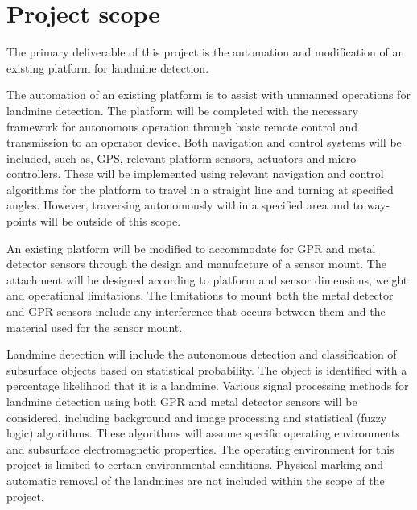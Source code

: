 \documentclass[main.tex]{subfiles}
\begin{document}
\section{Project scope}

The primary deliverable of this project is the automation and modification of an existing platform for landmine detection. %

The automation of an existing platform is to assist with unmanned operations for landmine detection. The platform will be completed with the necessary framework for autonomous operation through basic remote control and transmission to an operator device. Both navigation and control systems will be included, such as, GPS, relevant platform sensors, actuators and micro controllers. These will be implemented using relevant navigation and control algorithms for the platform to travel in a straight line and turning at specified angles. However, traversing autonomously within a specified area and to way-points will be outside of this scope. 

An existing platform will be modified to accommodate for GPR and metal detector sensors through the design and manufacture of a sensor mount. The attachment will be designed according to platform and sensor dimensions, weight and operational limitations. The limitations to mount both the metal detector and GPR sensors include any interference that occurs between them and the material used for the sensor mount.

Landmine detection will include the autonomous detection and classification of subsurface objects based on statistical probability. The object is identified with a percentage likelihood that it is a landmine. Various signal processing methods for landmine detection using both GPR and metal detector sensors will be considered, including background and image processing and statistical (fuzzy logic) algorithms. These algorithms will assume specific operating environments and subsurface electromagnetic properties. The operating environment for this project is limited to certain environmental conditions. Physical marking and automatic removal of the landmines are not included within the scope of the project.
\end{document}
